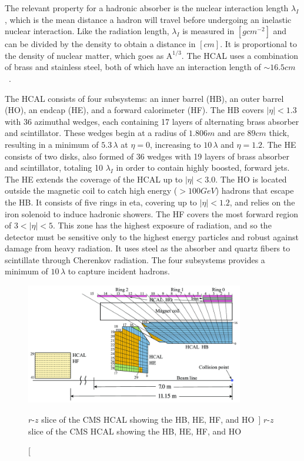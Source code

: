 The relevant property for a hadronic absorber is the nuclear interaction length $\lambda_I$, which is the mean distance a hadron will travel before undergoing an inelastic nuclear interaction. Like the radiation length, $\lambda_I$ is measured in $\left[\unit{g}\unit{cm^{-2}}\right]$ and can be divided by the density to obtain a distance in $\left[\unit{cm}\right]$. It is proportional to the density of nuclear matter, which goes as $\text{A}^{1/3}$. The HCAL uses a combination of brass and stainless steel, both of which have an interaction length of $\sim16.5\unit{cm}$~\cite{Baiatian:1049915}.

The HCAL consists of four subsystems: an inner barrel (HB), an outer barrel (HO), an endcap (HE), and a forward calorimeter (HF). The HB covers $\left|\eta\right|<1.3$ with 36 azimuthal wedges, each containing 17 layers of alternating brass absorber and scintillator. These wedges begin at a radius of $1.806\unit{m}$ and are $89\unit{cm}$ thick, resulting in a minimum of $5.3\,\lambda$ at $\eta=0$, increasing to $10\,\lambda$ and $\eta=1.2$. The HE consists of two disks, also formed of 36 wedges with 19 layers of brass absorber and scintillator, totaling 10 $\lambda_I$ in order to contain highly boosted, forward jets. The HE extends the coverage of the HCAL up to $\left|\eta\right| < 3.0$. The HO is located outside the magnetic coil to catch high energy ($>100\unit{GeV}$) hadrons that escape the HB. It consists of five rings in eta, covering up to $\left|\eta\right|<1.2$, and relies on the iron solenoid to induce hadronic showers. The HF covers the most forward region of $3<\left|\eta\right|<5$. This zone has the highest exposure of radiation, and so the detector must be sensitive only to the highest energy particles and robust against damage from heavy radiation. It uses steel as the absorber and quartz fibers to scintillate through Cherenkov radiation. The four subsystems provides a minimum of $10\,\lambda$ to capture incident hadrons.

\begin{figure}[htpb]
	\centering
	\includegraphics[width=0.85\textwidth]{figs/03_experiment/A-schematic-view-of-one-quarter-of-the-CMS-HCAL-during-2016-LHC-operation-showing-the.png}
	\caption
	[$r$-$z$ slice of the CMS HCAL showing the HB, HE, HF, and HO~\cite{Sirunyan:2691403}]
	{$r$-$z$ slice of the CMS HCAL showing the HB, HE, HF, and HO~\cite{Sirunyan:2691403}}
	\label{fig:hcal}
\end{figure}

